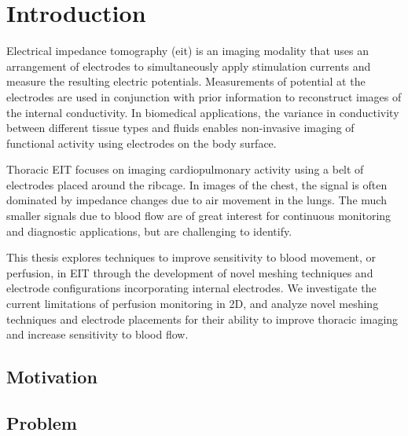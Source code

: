 \chapter{Introduction}

Electrical impedance tomography (\acrshort{eit}) is an imaging modality that uses an arrangement 
of electrodes to simultaneously apply 
stimulation currents and measure 
the resulting electric potentials. Measurements of potential at the 
electrodes are used in conjunction with 
prior information to reconstruct images 
of the internal conductivity. In biomedical applications, 
the variance in conductivity between different 
tissue types and fluids enables non-invasive 
imaging of functional activity using electrodes on the 
body surface. 

Thoracic EIT focuses on imaging cardiopulmonary activity
using a belt of electrodes placed around the ribcage.
In images of the chest, the signal is often dominated by 
impedance changes due to air movement in the lungs. 
The much smaller signals due to blood flow are of great interest for 
continuous monitoring and diagnostic applications,
but are challenging to identify. 

This thesis explores techniques to improve sensitivity to blood movement, or perfusion,  
in EIT through the development of novel meshing techniques and electrode configurations
incorporating internal electrodes. 
We investigate the current limitations of perfusion monitoring in 2D, and
analyze novel meshing techniques and electrode placements for their 
ability to improve thoracic imaging and increase sensitivity to blood flow. 

\section{Motivation}

\section{Problem}

